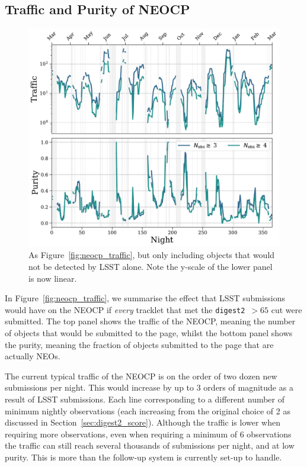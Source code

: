 \documentclass[twocolumn]{aastex631}
\newcommand{\dig}{\texttt{digest2}}
\begin{document}
\subsection{Traffic and Purity of NEOCP}\label{sec:traffic_basic}

\begin{figure}
    \centering
    \includegraphics[width=\textwidth]{traffic_purity_unfindable.pdf}
    \caption{As Figure~\ref{fig:neocp_traffic}, but only including objects that would not be detected by LSST alone. Note the y-scale of the lower panel is now linear.}
    \label{fig:neocp_traffic_unfindable}
\end{figure}

In Figure~\ref{fig:neocp_traffic}, we summarise the effect that LSST submissions would have on the NEOCP if \textit{every} tracklet that met the \dig{}~$>65$ cut were submitted. The top panel shows the traffic of the NEOCP, meaning the number of objects that would be submitted to the page, whilst the bottom panel shows the purity, meaning the fraction of objects submitted to the page that are actually NEOs.

The current typical traffic of the NEOCP is on the order of two dozen new submissions per night. This would increase by up to 3 orders of magnitude as a result of LSST submissions. Each line corresponding to a different number of minimum nightly observations (each increasing from the original choice of 2 as discussed in Section~\ref{sec:digest2_score}). Although the traffic is lower when requiring more observations, even when requiring a minimum of 6 observations the traffic can still reach several thousands of submissions per night, and at low purity. This is more than the follow-up system is currently set-up to handle.
\end{document}
